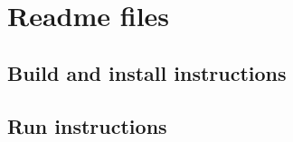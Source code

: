 \documentclass[a4paper]{article}
\begin{document}
\appendix
\clearpage
\section{Readme files}
\label{readmes}
\subsection{Build and install instructions}

\clearpage
\subsection{Run instructions}
\end{document}

